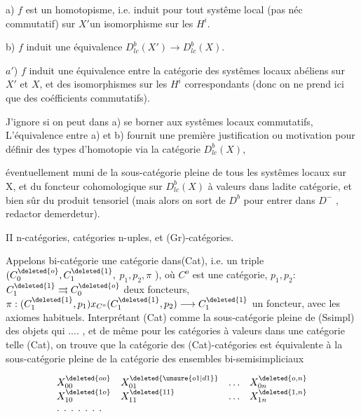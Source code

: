 a) \(f\) est un homotopisme, i.e. induit pour tout systême local (pas
néc commutatif) sur \(X'\)un isomorphisme sur les \(H^i\).

b)  \(f\) induit une équivalence \(D^b_{lc}(X')\longrightarrow D^b_{lc}(X)\).

\(a'\)) \(f\) induit une équivalence entre la catégorie des systêmes locaux
abéliens sur \(X'\) et \(X\), et des isomorphismes sur les \(H^i\) correspondants (donc
on ne prend ici que des coéfficients commutatifs).

 J'ignore si on peut dans a) se borner aux systêmes locaux commutatifs,
L'équivalence entre a) et b) fournit une première justification ou
motivation pour définir des types d'homotopie via la catégorie \(D^b_{lc}(X)\),


éventuellement muni de la sous-catégorie pleine de tous les systêmes locaux
sur X, et du foncteur cohomologique sur $D^b_{lc}(X)$ à valeurs dans ladite
catégorie, et bien sûr du produit tensoriel (mais alors on sort de $D^b$
pour entrer dans $D^-$ , redactor demerdetur).

II n-catégories, catégories n-uples, et (Gr)-catégories.

Appelons bi-catégorie une catégorie dans(Cat), i.e. un triple
$(C^{\deleted{o}}_{0},C^{\deleted{1}}_{1},$ $p_1,p_2,\pi$ ), où $C^o$ est une catégorie, $p_1,p_2$: $C^{\deleted{1}}_{1}\rightrightarrows C^{\deleted{o}}_{0}$ deux
foncteurs, $\pi:(C^{\deleted{1}}_{1},p_1)x_{C^o}(C^{\deleted{1}}_{1},p_2)\longrightarrow C^{\deleted{1}}_{1}$ un foncteur, avec les axiomes
habituels. Interprétant (Cat) comme la sous-catégorie pleine de (Ssimpl)
des objets qui .... , et de même pour les catégories à valeurs dans une
catégorie telle (Cat), on trouve que la catégorie  des (Cat)-catégories
est équivalente à la sous-catégorie pleine de la catégorie des ensembles
bi-semisimpliciaux

\[
\begin{array}{llll}
X^{\deleted{oo}}_{00} & X^{\deleted{\unsure{o1|d1}}}_{01} & \ldots & X^{\deleted{o,n}}_{0n}\\
X^{\deleted{1o}}_{10} & X^{\deleted{11}}_{11} & \ldots & X^{\deleted{1,n}}_{1n}\\
\multicolumn{4}{l}{\ldotp\;\ldotp\;\ldotp\;\ldotp\;\ldotp\;\ldotp\;\ldotp}
\end{array}
\]

